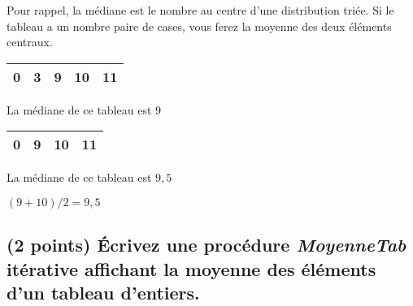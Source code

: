 \documentclass[11pt,a4paper]{article}
\begin{document}

Pour rappel, la médiane est le nombre au centre d'une distribution triée. Si le tableau a un nombre paire de cases, vous ferez la moyenne des deux éléments centraux.


\begin{table}[h!]
  \centering
  \begin{minipage}{0.4\textwidth}
    \centering
    \begin{tabular}{| c | c | c | c | c |}
      \hline
      0 & 3 & 9 & 10 & 11 \\
      \hline
    \end{tabular}

  \smallskip

  La médiane de ce tableau est $ 9 $
  \end{minipage}
    \hfillx
    \begin{minipage}{0.4\textwidth}
    \centering
    \begin{tabular}{| c | c | c | c |}
      \hline
      0 & 9 & 10 & 11 \\
      \hline
    \end{tabular}

  \smallskip

  La médiane de ce tableau est $ 9,5 $

  $ (9 + 10) / 2 = 9,5 $
  \end{minipage}
\end{table}

\begin{center}
\end{center}



\vfillLast
\newpage
\vfillFirst


\subsection{(2 points) \'Ecrivez une procédure \og \textit{MoyenneTab} \fg{} itérative affichant la moyenne des éléments d'un tableau d'entiers. }

\bigskip

\begin{center}
\end{center}
\end{document}
